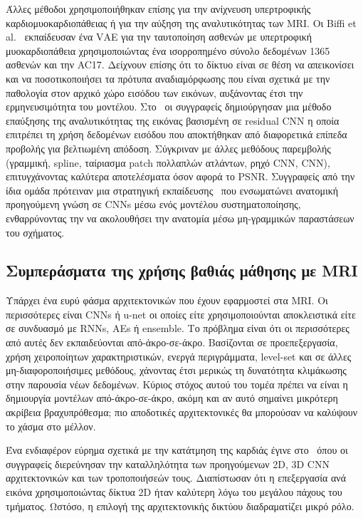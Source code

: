 Άλλες μέθοδοι χρησιμοποιήθηκαν επίσης για την ανίχνευση υπερτροφικής καρδιομυοκαρδιοπάθειας ή για την αύξηση της αναλυτικότητας των MRI\@.
Οι Biffi et al.~\cite{biffi2018learning} εκπαίδευσαν ένα VΑΕ για την ταυτοποίηση ασθενών με υπερτροφική μυοκαρδιοπάθεια χρησιμοποιώντας ένα ισορροπημένο σύνολο δεδομένων 1365 ασθενών και την AC17.
Δείχνουν επίσης ότι το δίκτυο είναι σε θέση να απεικονίσει και να ποσοτικοποιήσει τα πρότυπα αναδιαμόρφωσης που είναι σχετικά με την παθολογία στον αρχικό χώρο εισόδου των εικόνων, αυξάνοντας έτσι την ερμηνευσιμότητα του μοντέλου.
Στο~\cite{oktay2016multi} οι συγγραφείς δημιούργησαν μια μέθοδο επαύξησης της αναλυτικότητας της εικόνας βασισμένη σε residual CNN η οποία επιτρέπει τη χρήση δεδομένων εισόδου που αποκτήθηκαν από διαφορετικά επίπεδα προβολής για βελτιωμένη απόδοση.
Σύγκριναν με άλλες μεθόδους παρεμβολής (γραμμική, spline, ταίριασμα patch πολλαπλών ατλάντων, ρηχό CNN, CNN), επιτυγχάνοντας καλύτερα αποτελέσματα όσον αφορά το PSNR\@.
Συγγραφείς από την ίδια ομάδα πρότειναν μια στρατηγική εκπαίδευσης~\cite{oktay2018anatomically} που ενσωματώνει ανατομική προηγούμενη γνώση σε CNNs μέσω ενός μοντέλου συστηματοποίησης, ενθαρρύνοντας την να ακολουθήσει την ανατομία μέσω μη-γραμμικών παραστάσεων του σχήματος.

\subsection{Συμπεράσματα της χρήσης βαθιάς μάθησης με MRI}
Υπάρχει ένα ευρύ φάσμα αρχιτεκτονικών που έχουν εφαρμοστεί στα MRI\@.
Οι περισσότερες είναι CNNs ή u-net οι οποίες είτε χρησιμοποιούνται αποκλειστικά είτε σε συνδυασμό με RNNs, AEs ή ensemble.
Το πρόβλημα είναι ότι οι περισσότερες από αυτές δεν εκπαιδεύονται από-άκρο-σε-άκρο. Βασίζονται σε προεπεξεργασία, χρήση χειροποίητων χαρακτηριστικών, ενεργά περιγράμματα, level-set και σε άλλες μη-διαφοροποιήσιμες μεθόδους, χάνοντας έτσι μερικώς τη δυνατότητα κλιμάκωσης στην παρουσία νέων δεδομένων.
Κύριος στόχος αυτού του τομέα πρέπει να είναι η δημιουργία μοντέλων από-άκρο-σε-άκρο, ακόμη και αν αυτό σημαίνει μικρότερη ακρίβεια βραχυπρόθεσμα; πιο αποδοτικές αρχιτεκτονικές θα μπορούσαν να καλύψουν το χάσμα στο μέλλον.

Ένα ενδιαφέρον εύρημα σχετικά με την κατάτμηση της καρδιάς έγινε στο~\cite{konukoglu2018exploration} όπου οι συγγραφείς διερεύνησαν την καταλληλότητα των προηγούμενων 2D, 3D CNN αρχιτεκτονικών και των τροποποιήσεών τους.
Διαπίστωσαν ότι η επεξεργασία ανά εικόνα χρησιμοποιώντας δίκτυα 2D ήταν καλύτερη λόγω του μεγάλου πάχους του τμήματος.
Ωστόσο, η επιλογή της αρχιτεκτονικής δικτύου διαδραματίζει μικρό ρόλο.

